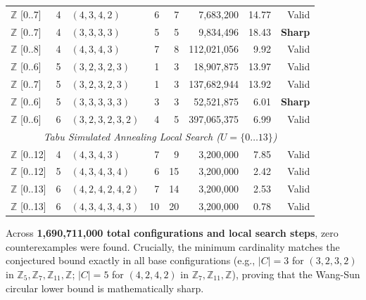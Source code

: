 \documentclass[11pt,a4paper]{article}
\theoremstyle{definition}
\theoremstyle{remark}
\begin{document}
\begin{table}[htbp]
\begin{tabular}{lllrrrrr}
$\mathbb{Z}$ [0..7] & 4 & $(4, 3, 4, 2)$ & 6  & 7  & 7,683,200     & 14.77 & Valid \\
$\mathbb{Z}$ [0..7] & 4 & $(3, 3, 3, 3)$ & 5  & 5  & 9,834,496     & 18.43 & \textbf{Sharp} \\
$\mathbb{Z}$ [0..8] & 4 & $(4, 3, 4, 3)$ & 7  & 8  & 112,021,056   & 9.92  & Valid \\
$\mathbb{Z}$ [0..6] & 5 & $(3, 2, 3, 2, 3)$ & 1  & 3  & 18,907,875    & 13.97 & Valid \\
$\mathbb{Z}$ [0..7] & 5 & $(3, 2, 3, 2, 3)$ & 1  & 3  & 137,682,944   & 13.92 & Valid \\
$\mathbb{Z}$ [0..6] & 5 & $(3, 3, 3, 3, 3)$ & 3  & 3  & 52,521,875    & 6.01  & \textbf{Sharp} \\
$\mathbb{Z}$ [0..6] & 6 & $(3, 2, 3, 2, 3, 2)$ & 4  & 5  & 397,065,375   & 6.99  & Valid \\
\midrule
\multicolumn{8}{c}{\textit{Tabu Simulated Annealing Local Search ($U = \{0 \dots 13\}$)}} \\
$\mathbb{Z}$ [0..12] & 4 & $(4, 3, 4, 3)$ & 7  & 9  & 3,200,000 & 7.85 & Valid \\
$\mathbb{Z}$ [0..12] & 5 & $(4, 3, 4, 3, 4)$ & 6  & 15 & 3,200,000 & 2.42 & Valid \\
$\mathbb{Z}$ [0..13] & 6 & $(4, 2, 4, 2, 4, 2)$ & 7  & 14 & 3,200,000 & 2.53 & Valid \\
$\mathbb{Z}$ [0..13] & 6 & $(4, 3, 4, 3, 4, 3)$ & 10 & 20 & 3,200,000 & 0.78 & Valid \\
\bottomrule
\end{tabular}
\end{table}

Across \textbf{1,690,711,000 total configurations and local search steps}, zero counterexamples were found. Crucially, the minimum cardinality matches the conjectured bound exactly in all base configurations (e.g., $|C| = 3$ for $(3,2,3,2)$ in $\mathbb{Z}_5, \mathbb{Z}_7, \mathbb{Z}_{11}, \mathbb{Z}$; $|C| = 5$ for $(4,2,4,2)$ in $\mathbb{Z}_7, \mathbb{Z}_{11}, \mathbb{Z}$), proving that the Wang-Sun circular lower bound is mathematically sharp.
\end{document}
